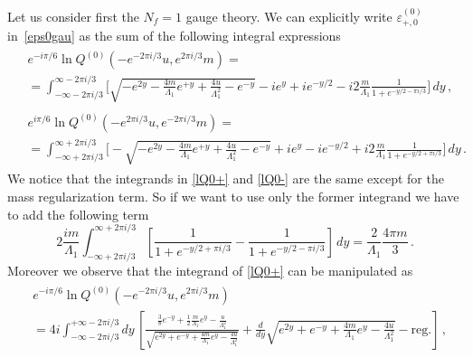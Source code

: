 \documentclass[11pt,a4paper]{elsarticle}
\def \ve {\varepsilon}
\def \ba {\begin{aligned}}
\def \ea {\end{aligned}}
\newcommand{\be}{\begin{equation}}
\newcommand{\ee}{\end{equation}}
\numberwithin{figure}{section}
\numberwithin{table}{section}
\begin{document}
Let us consider first the $N_f=1$ gauge theory. We can explicitly write $\ve^{(0)}_{+,0}$ in~\eqref{eps0gau} as the sum of the following integral expressions
\begin{align} \label{lQ0+}
\begin{split}%
&e^{-i\pi/6}\ln Q^{(0)}(-e^{-2\pi i/3}u,e^{2\pi i/3}m)=\\
&=  \int_{-\infty-2\pi i/3}^{\infty-2\pi i/3} \biggl[\sqrt{-e^{2 y} - \frac{4 m}{\Lambda_1}e^{+y} +\frac{4 u}{\Lambda_1^2}  - e^{-y}}-i e^y+ i e^{-y/2}-i 2\frac{m}{\Lambda_1}\frac{1}{1+e^{-y/2-\pi i/3}} \biggr]\,d y\,,
\end{split}
\end{align}
\begin{align}  \label{lQ0-}
\begin{split}
&e^{i\pi/6}\ln Q^{(0)}(-e^{2\pi i/3}u,e^{-2\pi i/3}m)=\\
&=  \int_{-\infty+2\pi i/3}^{\infty+2\pi i/3} \biggl[-\sqrt{-e^{2 y} - \frac{4 m}{\Lambda_1}e^{+y} +\frac{4 u}{\Lambda_1^2}  - e^{-y}}+i e^y- i e^{-y/2}+i 2\frac{m}{\Lambda_1}\frac{1}{1+e^{-y/2+\pi i/3}} \biggr]\,d y\,.
\end{split}
\end{align}
We notice that the integrands in \eqref{lQ0+} and \eqref{lQ0-} are the same except for the mass regularization term. So if we want to use only the former integrand we have to add the following term%
\be \label{mregdiff}
2 \frac{ i m}{\Lambda_1}  \int_{-\infty+2\pi i/3}^{\infty+2\pi i/3} \left[\frac{1}{1+e^{-y/2+\pi i/3}} -\frac{1}{1+e^{-y/2-\pi i/3}}\right]\,d y=\frac{2}{\Lambda_1}\frac{4\pi m}{3}\,.
\ee 
Moreover we observe that the integrand of \eqref{lQ0+} can be manipulated as
\begin{align}
 \begin{split}  &e^{-i\pi/6} \ln Q^{(0)}(-e^{-2\pi i/3}u,e^{2 \pi i/3}m)\\ 
    &= 4 i \int_{-\infty-2\pi i/3}^{+\infty-2\pi i/3} d y\,\left[\frac{\frac{3}{8}e^{-y}+\frac{1}{2}\frac{m}{\Lambda_1} e^y-\frac{u}{\Lambda_1^2}}{\sqrt{e^{2y}+e^{-y}+\frac{4m}{\Lambda_1} e^y-\frac{4u}{\Lambda_1^2}}}+\frac{d}{d y}\sqrt{e^{2y}+e^{-y}+\frac{4m}{\Lambda_1} e^y-\frac{4u}{\Lambda_1^2}}-\mathrm{reg.}\right] \,,
   \end{split}
    \end{align}
\end{document}
